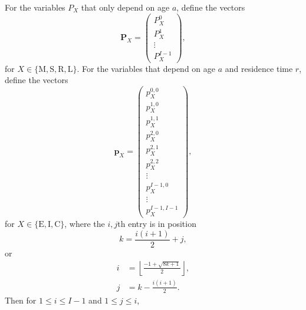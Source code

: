 \documentclass[12pt]{article}
\renewcommand{\vec}[1]{\mathbf{#1}}
\begin{document}
For the variables $P_X$ that only depend on age $a$,
define the vectors
\begin{equation}
  \vec{P}_X =
  \begin{pmatrix}
    P_X^0\\
    P_X^1\\
    \vdots\\
    P_X^{I - 1}
  \end{pmatrix},
\end{equation}
for $X \in \{\mathrm{M}, \mathrm{S}, \mathrm{R}, \mathrm{L}\}$.
For the variables that depend on age $a$ and residence time $r$,
define the vectors
\begin{equation}
  \vec{p}_X =
  \begin{pmatrix}
    p_X^{0, 0}\\
    p_X^{1, 0}\\
    p_X^{1, 1}\\
    p_X^{2, 0}\\
    p_X^{2, 1}\\
    p_X^{2, 2}\\
    \vdots\\
    p_X^{I - 1, 0}\\
    \vdots\\
    p_X^{I - 1, I - 1}
  \end{pmatrix},
\end{equation}
for $X \in \{\mathrm{E}, \mathrm{I}, \mathrm{C}\}$,
where the $i, j$th entry is in position
\begin{equation}
  k = \frac{i (i + 1)}{2} + j,
\end{equation}
or
\begin{align}
  i &= \left\lfloor\frac{- 1 + \sqrt{8 k + 1}}{2}\right\rfloor,
  \\
  j &= k - \frac{i (i + 1)}{2}.
\end{align}
Then for $1 \leq i \leq I - 1$ and $1 \leq j \leq i$,
\end{document}

